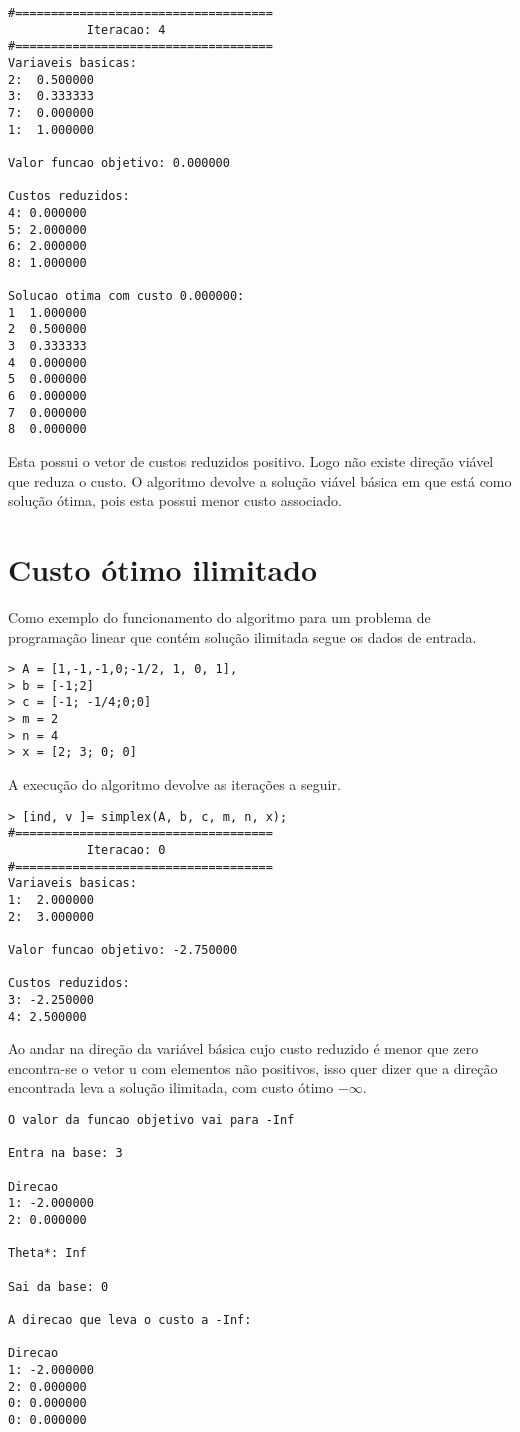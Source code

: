 \documentclass[
	12pt,				%
	openright,			%
	oneside,			%
	a4paper,			%
	english,			%
	french,				%
	spanish,			%
	brazil,				%
	]{abntex2}
\begin{document}
\begin{verbatim}
#====================================
           Iteracao: 4
#====================================
Variaveis basicas:
2:  0.500000
3:  0.333333
7:  0.000000
1:  1.000000

Valor funcao objetivo: 0.000000

Custos reduzidos:
4: 0.000000
5: 2.000000
6: 2.000000
8: 1.000000

Solucao otima com custo 0.000000:
1  1.000000
2  0.500000
3  0.333333
4  0.000000
5  0.000000
6  0.000000
7  0.000000
8  0.000000
\end{verbatim}

Esta possui o vetor de custos reduzidos positivo. Logo não existe direção viável que reduza o custo. O algoritmo devolve a solução viável básica em que está como solução ótima, pois esta possui menor custo associado.  
  
  
\section{Custo ótimo ilimitado}
Como exemplo do funcionamento do algoritmo para um problema de programação linear que contém solução ilimitada segue os dados de entrada.

\begin{verbatim}
> A = [1,-1,-1,0;-1/2, 1, 0, 1],
> b = [-1;2]
> c = [-1; -1/4;0;0]
> m = 2
> n = 4
> x = [2; 3; 0; 0]
\end{verbatim}

A execução do algoritmo devolve as iterações a seguir. 

\begin{verbatim}
> [ind, v ]= simplex(A, b, c, m, n, x);
#====================================
           Iteracao: 0
#====================================
Variaveis basicas:
1:  2.000000
2:  3.000000

Valor funcao objetivo: -2.750000

Custos reduzidos:
3: -2.250000
4: 2.500000
\end{verbatim}

Ao andar na direção da variável básica cujo custo reduzido é menor que zero encontra-se o vetor u com elementos não positivos, isso quer dizer que a direção encontrada leva a solução ilimitada, com custo ótimo $-\infty$.

\begin{verbatim}
O valor da funcao objetivo vai para -Inf

Entra na base: 3

Direcao
1: -2.000000
2: 0.000000

Theta*: Inf

Sai da base: 0

A direcao que leva o custo a -Inf:

Direcao
1: -2.000000
2: 0.000000
0: 0.000000
0: 0.000000
\end{verbatim}
\end{document}
